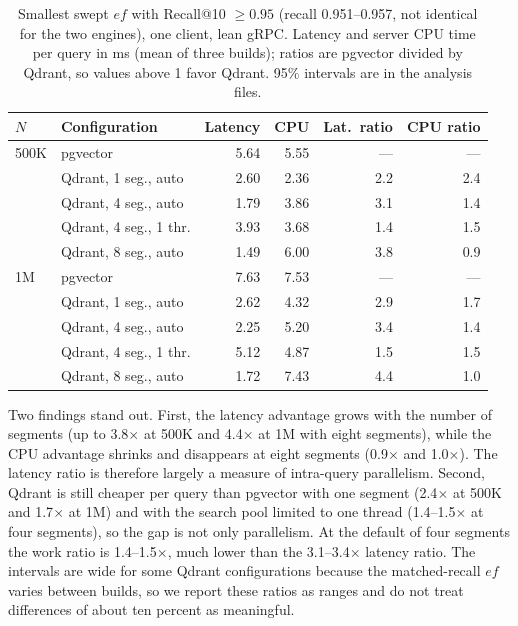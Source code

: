 \documentclass[sigconf, nonacm]{acmart}
\begin{document}
\begin{table}[t]
  \caption{Smallest swept $ef$ with Recall@10 $\ge 0.95$ (recall 0.951--0.957, not identical
  for the two engines), one client, lean gRPC. Latency and server CPU time per
  query in ms (mean of three builds); ratios are pgvector divided by Qdrant, so values
  above 1 favor Qdrant. 95\% intervals are in the analysis files.}
  \label{tab:cpu}
  \small
  \begin{tabular}{llrrrr}
    \toprule
    $N$ & Configuration & Latency & CPU & Lat.\ ratio & CPU ratio \\
    \midrule
    500K & pgvector              & 5.64 & 5.55 & --- & --- \\
         & Qdrant, 1 seg., auto  & 2.60 & 2.36 & 2.2 & 2.4 \\
         & Qdrant, 4 seg., auto  & 1.79 & 3.86 & 3.1 & 1.4 \\
         & Qdrant, 4 seg., 1 thr.& 3.93 & 3.68 & 1.4 & 1.5 \\
         & Qdrant, 8 seg., auto  & 1.49 & 6.00 & 3.8 & 0.9 \\
    \midrule
    1M   & pgvector              & 7.63 & 7.53 & --- & --- \\
         & Qdrant, 1 seg., auto  & 2.62 & 4.32 & 2.9 & 1.7 \\
         & Qdrant, 4 seg., auto  & 2.25 & 5.20 & 3.4 & 1.4 \\
         & Qdrant, 4 seg., 1 thr.& 5.12 & 4.87 & 1.5 & 1.5 \\
         & Qdrant, 8 seg., auto  & 1.72 & 7.43 & 4.4 & 1.0 \\
    \bottomrule
  \end{tabular}
\end{table}

Two findings stand out. First, the latency advantage grows with the number of segments
(up to 3.8$\times$ at 500K and 4.4$\times$ at 1M with eight segments), while the CPU
advantage shrinks and disappears at eight segments (0.9$\times$ and 1.0$\times$). The
latency ratio is therefore largely a measure of intra-query parallelism. Second, Qdrant
is still cheaper per query than pgvector with one segment (2.4$\times$ at 500K and
1.7$\times$ at 1M) and with the search pool limited to one thread (1.4--1.5$\times$ at
four segments), so the gap is not only parallelism. At the default of four segments the
work ratio is 1.4--1.5$\times$, much lower than the 3.1--3.4$\times$ latency ratio. The
intervals are wide for some Qdrant configurations because the matched-recall $ef$ varies
between builds, so we report these ratios as ranges and do not treat differences of
about ten percent as meaningful.
\end{document}
